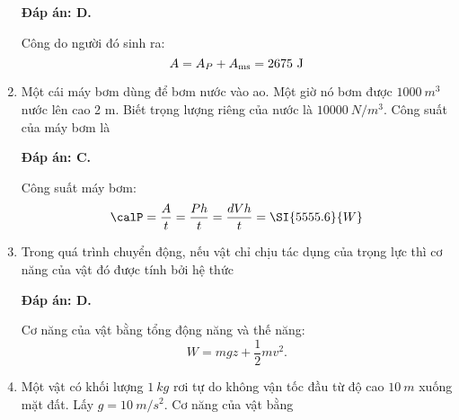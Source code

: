 \begin{enumerate}[label=\bfseries Câu \arabic*:, leftmargin=1.5cm]
{		
	}
	
	\hideall
	{	
		\textbf{Đáp án: D.}
		
		Công do người đó sinh ra:
		$$A=A_P + A_\text{ms} = 2675\ \text J$$	
	}
	\item {}
	
	
	{
		Một cái máy bơm dùng để bơm nước vào ao. Một giờ nó bơm được $\SI{1000}{m^3}$ nước lên cao 2 m. Biết trọng lượng riêng của nước là $\SI{10000}{N/m^3}$. Công suất của máy bơm là
		
	}
	
	\hideall
	{	
		\textbf{Đáp án: C.}
		
		Công suất máy bơm:
		$$\calP = \dfrac{A}{t} = \dfrac{Ph}{t} = \dfrac{dVh}{t} = \SI{5555.6}{W}$$
	}
	\item {}
	
	
	{
		Trong quá trình chuyển động, nếu vật chỉ chịu tác dụng của trọng lực thì cơ năng của vật đó được tính bởi hệ thức
	}
	
	\hideall
	{	
		\textbf{Đáp án: D.}
		
		Cơ năng của vật bằng tổng động năng và thế năng:
		$$W=mgz+\dfrac{1}{2}mv^2.$$
	}
	\item {}
	
	
	{
		Một vật có khối lượng $\SI{1}{kg}$ rơi tự do không vận tốc đầu từ độ cao $\SI{10}{m}$ xuống mặt đất. Lấy $g=\SI{10}{m/s^2}$. Cơ năng của vật bằng
	}
	

\end{enumerate}
